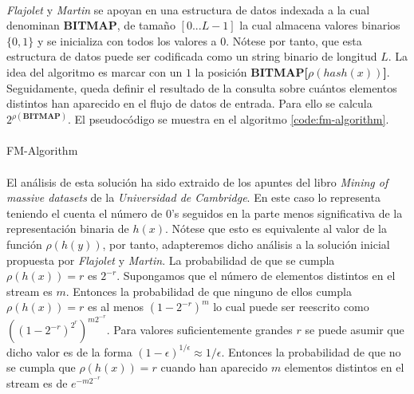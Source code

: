 \documentclass{subfiles}
\begin{document}
      \paragraph{}
      \emph{Flajolet} y \emph{Martin} se apoyan en una estructura de datos indexada a la cual denominan \textbf{BITMAP}, de tamaño $[0...L-1]$ la cual almacena valores binarios $\{ 0, 1\}$ y se inicializa con todos los valores a $0$. Nótese por tanto, que esta estructura de datos puede ser codificada como un string binario de longitud $L$. La idea del algoritmo es marcar con un $1$ la posición \textbf{BITMAP[$\rho(hash(x))$]}. Seguidamente, queda definir el resultado de la consulta sobre cuántos elementos distintos han aparecido en el flujo de datos de entrada. Para ello se calcula $2^{\rho(\textbf{BITMAP})}$. El pseudocódigo se muestra en el algoritmo \ref{code:fm-algorithm}.

      \paragraph{}
      \begin{algorithm}[h]
        \SetAlgoLined
        \caption{FM-Algorithm}
        \label{code:fm-algorithm}
      \end{algorithm}

      \paragraph{}
      El análisis de esta solución ha sido extraido de los apuntes del libro \emph{Mining of massive datasets} \cite{leskovec2014mining} de la \emph{Universidad de Cambridge}. En este caso lo representa teniendo el cuenta el número de $0$'s seguidos en la parte menos significativa de la representación binaria de $h(x)$. Nótese que esto es equivalente al valor de la función $\rho(h(y))$, por tanto, adapteremos dicho análisis a la solución inicial propuesta por \emph{Flajolet} y \emph{Martin}. La probabilidad de que se cumpla $\rho(h(x)) = r$ es $2^{-r}$. Supongamos que el número de elementos distintos en el stream es $m$. Entonces la probabilidad de que ninguno de ellos cumpla $\rho(h(x)) = r$ es al menos $(1- 2^{-r})^m$ lo cual puede ser reescrito como $((1- 2^{-r})^{2^r})^{m2^{-r}}$. Para valores suficientemente grandes $r$ se puede asumir que dicho valor es de la forma $(1-\epsilon)^{1/\epsilon} \approx 1/\epsilon$. Entonces la probabilidad de que no se cumpla que $\rho(h(x)) = r$ cuando han aparecido $m$ elementos distintos en el stream es de $e^{-m2^{-r}}$
\end{document}
